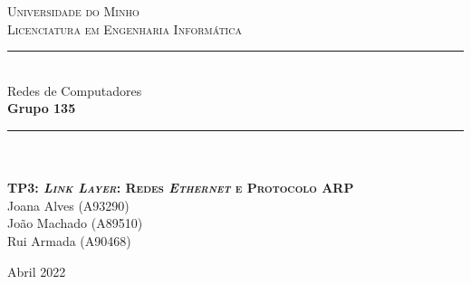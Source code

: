 \documentclass[12pt]{article}
\begin{document}
\begin{titlepage}

\center %

\newcommand{\HRule}{\rule{\linewidth}{0.4mm}} %

\textsc{\LARGE Universidade do Minho}\\[0.5cm]  %

\vspace{1cm}
\textsc{\large Licenciatura em Engenharia Informática}\\[1.5cm] %
\vspace{0.5cm}

\HRule \\[0.5cm]
{ \LARGE \bfseries } Redes de Computadores \\[0.5cm] %
{ \LARGE \bfseries } \textbf{Grupo 135} \\[0.5cm] %
\HRule \\[1cm]
\vspace{0.1cm}
 
\paragraph{}
\paragraph{}
\textsc{\Large \textbf{TP3: \textit{Link Layer}: Redes \textit{Ethernet} e Protocolo ARP}}\\[0.75cm] %
\vspace{2.5cm} %
Joana Alves (A93290) \\ \vspace{3mm}
João Machado (A89510) \\ \vspace{3mm} 
Rui Armada (A90468) \\ \vspace{3mm}

\vspace{3cm}


\vspace*{\fill}

{\large Abril 2022}\\[2cm] %

\vfill %
\end{titlepage}
\end{document}
